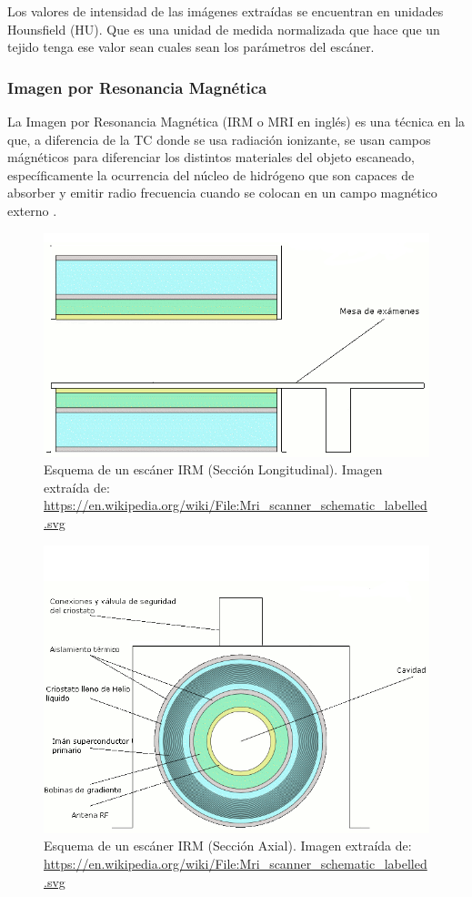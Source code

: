 Los valores de intensidad de las imágenes extraídas se encuentran en unidades Hounsfield (HU). Que es una unidad de medida normalizada que hace que un tejido tenga ese valor sean cuales sean los parámetros del escáner.

\subsubsection{Imagen por Resonancia Magnética}

La Imagen por Resonancia Magnética (IRM o MRI en inglés) es una técnica en la que, a diferencia de la TC donde se usa radiación ionizante, se usan campos mágnéticos para diferenciar los distintos materiales del objeto escaneado, específicamente la ocurrencia del núcleo de hidrógeno que son capaces de absorber y emitir radio frecuencia cuando se colocan en un campo magnético externo \cite{mcrobbie10}.

\begin{figure}[H]
	\centering
	\includegraphics[width=12cm]{imagenes/desarrollo/irm-longitudinal}
	\caption{Esquema de un escáner IRM (Sección Longitudinal). Imagen extraída de: \url{https://en.wikipedia.org/wiki/File:Mri_scanner_schematic_labelled.svg}}
	\label{fig:desarrollo/irm-longitudinal}
\end{figure}

\begin{figure}[H]
	\centering
	\includegraphics[width=12cm]{imagenes/desarrollo/irm-axial}
	\caption{Esquema de un escáner IRM (Sección Axial). Imagen extraída de: \url{https://en.wikipedia.org/wiki/File:Mri_scanner_schematic_labelled.svg}}
	\label{fig:desarrollo/irm-axial}
\end{figure}

